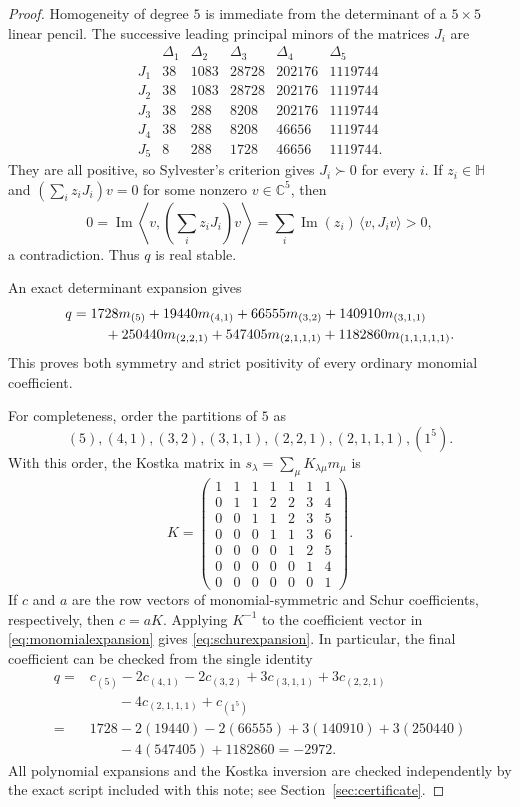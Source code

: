 \documentclass[11pt]{article}
\theoremstyle{remark}
\newcommand{\C}{\mathbb C}
\newcommand{\HP}{\mathbb H}
\begin{document}
\begin{proof}
Homogeneity of degree $5$ is immediate from the determinant of a $5\times5$
linear pencil.  The successive leading principal minors of the matrices $J_i$
are
\[
\begin{array}{c|rrrrr}
 &\Delta_1&\Delta_2&\Delta_3&\Delta_4&\Delta_5\\ \hline
J_1&38&1083&28728&202176&1119744\\
J_2&38&1083&28728&202176&1119744\\
J_3&38&288&8208&202176&1119744\\
J_4&38&288&8208&46656&1119744\\
J_5&8&288&1728&46656&1119744.
\end{array}
\]
They are all positive, so Sylvester's criterion gives $J_i\succ0$ for every $i$.
If $z_i\in\HP$ and
$\left(\sum_i z_iJ_i\right)v=0$ for some nonzero $v\in\C^5$, then
\[
0=\operatorname{Im}\left\langle v,
       \left(\sum_i z_iJ_i\right)v\right\rangle
  =\sum_i \operatorname{Im}(z_i)\,\langle v,J_iv\rangle>0,
\]
a contradiction.  Thus $q$ is real stable.

An exact determinant expansion gives
\begin{align}
q={}&1728m_{(5)}+19440m_{(4,1)}+66555m_{(3,2)}
     +140910m_{(3,1,1)}\notag\\
 &\quad +250440m_{(2,2,1)}+547405m_{(2,1,1,1)}
     +1182860m_{(1,1,1,1,1)}.
\label{eq:monomialexpansion}
\end{align}
This proves both symmetry and strict positivity of every ordinary monomial
coefficient.

For completeness, order the partitions of $5$ as
\[
(5),(4,1),(3,2),(3,1,1),(2,2,1),(2,1,1,1),(1^5).
\]
With this order, the Kostka matrix in
$s_\lambda=\sum_\mu K_{\lambda\mu}m_\mu$ is
\[
K=
\begin{pmatrix}
1&1&1&1&1&1&1\\
0&1&1&2&2&3&4\\
0&0&1&1&2&3&5\\
0&0&0&1&1&3&6\\
0&0&0&0&1&2&5\\
0&0&0&0&0&1&4\\
0&0&0&0&0&0&1
\end{pmatrix}.
\]
If $c$ and $a$ are the row vectors of monomial-symmetric and Schur
coefficients, respectively, then $c=aK$.  Applying $K^{-1}$ to the coefficient
vector in \eqref{eq:monomialexpansion} gives \eqref{eq:schurexpansion}.  In
particular, the final coefficient can be checked from the single identity
\begin{align*}
[s_{(1^5)}]q
={}&c_{(5)}-2c_{(4,1)}-2c_{(3,2)}+3c_{(3,1,1)}
       +3c_{(2,2,1)}\\
&\qquad -4c_{(2,1,1,1)}+c_{(1^5)}\\
={}&1728-2(19440)-2(66555)+3(140910)+3(250440)\\
&\qquad -4(547405)+1182860=-2972.
\end{align*}
All polynomial expansions and the Kostka inversion are checked independently by
the exact script included with this note; see Section~\ref{sec:certificate}.
\end{proof}
\end{document}

